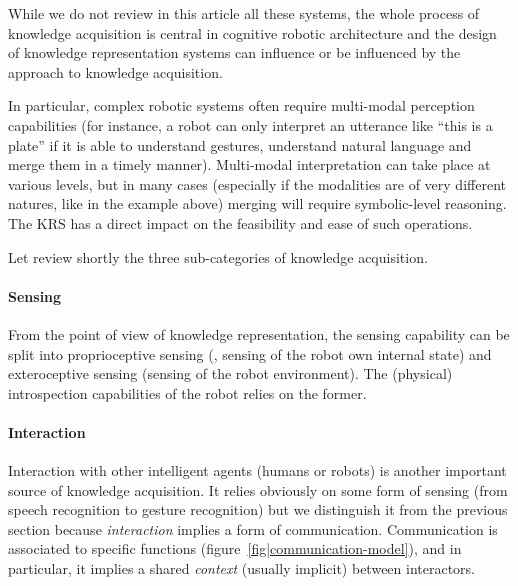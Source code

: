 While we do not review in this article all these systems, the whole process of
knowledge acquisition is central in cognitive robotic architecture and the
design of knowledge representation systems can influence or be influenced by
the approach to knowledge acquisition.

In particular, complex robotic systems often require multi-modal perception
capabilities (for instance, a robot can only interpret an utterance like ``this
is a plate'' if it is able to understand gestures, understand natural language
and merge them in a timely manner). Multi-modal interpretation can take place
at various levels, but in many cases (especially if the modalities are of very
different natures, like in the example above) merging will require
symbolic-level reasoning. The KRS has a direct impact on the feasibility and
ease of such operations.

Let review shortly the three sub-categories of knowledge acquisition.

\begin{scriptsize}
\begin{center}
\end{center}
\end{scriptsize}

\paragraph{Sensing}

From the point of view of knowledge representation, the sensing capability can
be split into proprioceptive sensing (\ie, sensing of the robot own internal
state) and exteroceptive sensing (sensing of the robot environment). The
(physical) introspection capabilities of the robot relies on the former.


\paragraph{Interaction}

Interaction with other intelligent agents (humans or robots) is another
important source of knowledge acquisition. It relies obviously on some form of
sensing (from speech recognition to gesture recognition) but we distinguish it
from the previous section because \emph{interaction} implies a form of
communication. Communication is associated to specific functions
(figure~\ref{fig|communication-model}), and in particular, it implies a shared
\emph{context} (usually implicit) between interactors.



